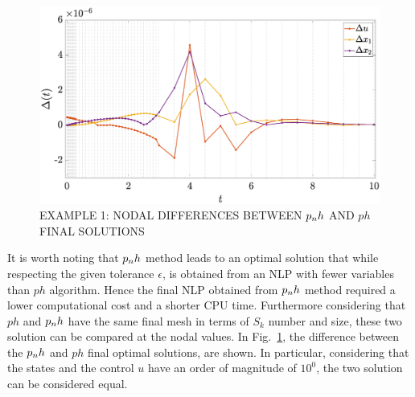 \begin{figure}[t]
	\centering
	\includegraphics[trim={2cm 0.5cm 4cm 0.3cm},clip,width=1\columnwidth]{Img/delta_vanderpol}
	\caption{EXAMPLE 1: NODAL DIFFERENCES BETWEEN $p_{n}h$ AND $ph$ FINAL SOLUTIONS}
	\label{fig:deltavanderpol}
\end{figure}
It is worth noting that $p_{n}h$ method leads to an optimal solution that while respecting the given tolerance $\epsilon$, is obtained from an NLP with fewer variables than $ph$ algorithm.
Hence the final NLP obtained from $p_{n}h$ method required a lower computational cost and a shorter CPU time.
Furthermore considering that $ph$ and $p_{n}h$ have the same final mesh in terms of $S_k$ number and size, these two solution can be compared at the nodal values.
In Fig.~\ref{fig:deltavanderpol}, the difference between the $p_{n}h$ and $ph$ final optimal solutions, are shown.
In particular, considering that the states and the control $u$ have an order of magnitude of $10^{0}$, the two solution can be considered equal.
